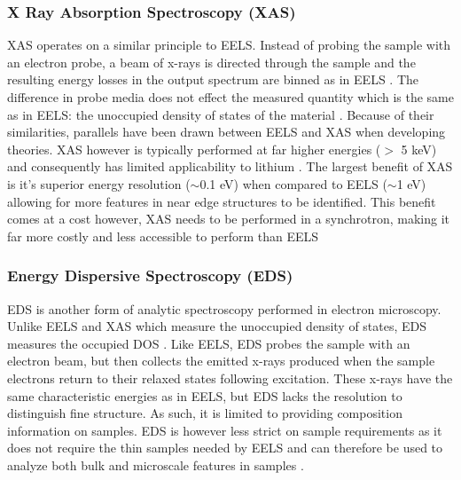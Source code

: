 \subsubsection{X Ray Absorption Spectroscopy (XAS)}
XAS operates on a similar principle to EELS.  Instead of probing the sample with an electron probe, a beam of x-rays is directed through the sample and the resulting energy losses in the output spectrum are binned as in EELS \cite{groot_high-resolution_2001}.  The difference in probe media does not effect the measured quantity which is the same as in EELS: the unoccupied density of states of the material \cite{groot_high-resolution_2001}.  Because of their similarities, parallels have been drawn between EELS and XAS when developing theories. XAS however is typically performed at far higher energies ($>$ 5 keV) and consequently has limited applicability to lithium \cite{maclaren_eels_2018}.  The largest benefit of XAS is it's superior energy resolution ($\sim$0.1 eV) when compared to EELS ($\sim$1 eV) allowing for more features in near edge structures to be identified\cite{Egerton, groot_high-resolution_2001}.  This benefit comes at a cost however, XAS needs to be performed in a synchrotron, making it far more costly and less accessible to perform than EELS


\subsubsection{Energy Dispersive Spectroscopy (EDS)}
EDS is another form of analytic spectroscopy performed in electron microscopy.   Unlike EELS and XAS which measure the unoccupied density of states, EDS measures the occupied DOS \cite{goldstein_electron_2003}.  Like EELS, EDS probes the sample with an electron beam, but then collects the emitted x-rays produced when the sample electrons return to their relaxed states following excitation.  These x-rays have the same characteristic energies as in EELS, but EDS lacks the resolution to distinguish fine structure.  As such, it is limited to providing composition information on samples.  EDS is however less strict on sample requirements as it does not require the thin samples needed by EELS and can therefore be used to analyze both bulk and microscale features in samples \cite{goldstein_electron_2003}.






